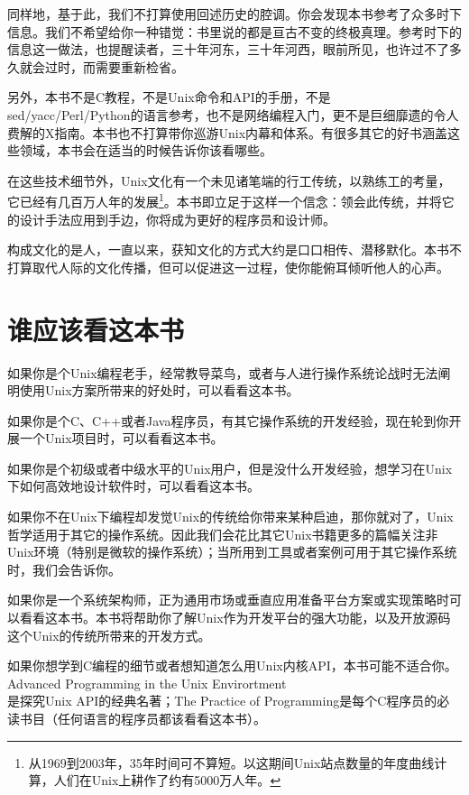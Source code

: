 \documentclass[12pt,oneside]{book}
\begin{document}
\begin{common-format}
同样地，基于此，我们不打算使用回述历史的腔调。你会发现本书参考了众多时下信息。我们不希望给你一种错觉：书里说的都是亘古不变的终极真理。参考时下的信息这一做法，也提醒读者，三十年河东，三十年河西，眼前所见，也许过不了多久就会过时，而需要重新检省。

另外，本书不是C教程，不是Unix命令和API的手册，不是\\ sed/yacc/Perl/Python的语言参考，也不是网络编程入门，更不是巨细靡遗的令人费解的X指南。本书也不打算带你巡游Unix内幕和体系。有很多其它的好书涵盖这些领域，本书会在适当的时候告诉你该看哪些。

在这些技术细节外，Unix文化有一个未见诸笔端的行工传统，以熟练工的考量，它已经有几百万人年的发展\footnote{从1969到2003年，35年时间可不算短。以这期间Unix站点数量的年度曲线计算，人们在Unix上耕作了约有5000万人年。}。本书即立足于这样一个信念：领会此传统，并将它的设计手法应用到手边，你将成为更好的程序员和设计师。

构成文化的是人，一直以来，获知文化的方式大约是口口相传、潜移默化。本书不打算取代人际的文化传播，但可以促进这一过程，使你能俯耳倾听他人的心声。


\section{谁应该看这本书}
如果你是个Unix编程老手，经常教导菜鸟，或者与人进行操作系统论战时无法阐明使用Unix方案所带来的好处时，可以看看这本书。

如果你是个C、C++或者Java程序员，有其它操作系统的开发经验，现在轮到你开展一个Unix项目时，可以看看这本书。

如果你是个初级或者中级水平的Unix用户，但是没什么开发经验，想学习在Unix下如何高效地设计软件时，可以看看这本书。

如果你不在Unix下编程却发觉Unix的传统给你带来某种启迪，那你就对了，Unix哲学适用于其它的操作系统。因此我们会花比其它Unix书籍更多的篇幅关注非Unix环境（特别是微软的操作系统）；当所用到工具或者案例可用于其它操作系统时，我们会告诉你。

如果你是一个系统架构师，正为通用市场或垂直应用准备平台方案或实现策略时可以看看这本书。本书将帮助你了解Unix作为开发平台的强大功能，以及开放源码这个Unix的传统所带来的开发方式。

如果你想学到C编程的细节或者想知道怎么用Unix内核API，本书可能不适合你。Advanced Programming in the Unix Envirortment \\ \cite{Stevens92}是探究Unix API的经典名著；The Practice of Programming\cite{Kernighan-Pike99}是每个C程序员的必读书目（任何语言的程序员都该看看这本书）。


\end{common-format}
\end{document}
